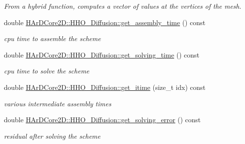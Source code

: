 \begin{DoxyCompactItemize}
\begin{DoxyCompactList}\small\item\em From a hybrid function, computes a vector of values at the vertices of the mesh. \end{DoxyCompactList}\item 
\mbox{\label{group__HHO__Diffusion_ga4b67f061d06b1aea5a626792a2bddd1e}} 
double \hyperlink{group__HHO__Diffusion_ga4b67f061d06b1aea5a626792a2bddd1e}{H\+Ar\+D\+Core2\+D\+::\+H\+H\+O\+\_\+\+Diffusion\+::get\+\_\+assembly\+\_\+time} () const
\begin{DoxyCompactList}\small\item\em cpu time to assemble the scheme \end{DoxyCompactList}\item 
\mbox{\label{group__HHO__Diffusion_ga0ba01c42bc116f962b6982b27e95b471}} 
double \hyperlink{group__HHO__Diffusion_ga0ba01c42bc116f962b6982b27e95b471}{H\+Ar\+D\+Core2\+D\+::\+H\+H\+O\+\_\+\+Diffusion\+::get\+\_\+solving\+\_\+time} () const
\begin{DoxyCompactList}\small\item\em cpu time to solve the scheme \end{DoxyCompactList}\item 
\mbox{\label{group__HHO__Diffusion_ga43051dfce03a9f75c33903f1736f4e1a}} 
double \hyperlink{group__HHO__Diffusion_ga43051dfce03a9f75c33903f1736f4e1a}{H\+Ar\+D\+Core2\+D\+::\+H\+H\+O\+\_\+\+Diffusion\+::get\+\_\+itime} (size\+\_\+t idx) const
\begin{DoxyCompactList}\small\item\em various intermediate assembly times \end{DoxyCompactList}\item 
\mbox{\label{group__HHO__Diffusion_gad53ffa4a52af7bf6803e28f36c7e3365}} 
double \hyperlink{group__HHO__Diffusion_gad53ffa4a52af7bf6803e28f36c7e3365}{H\+Ar\+D\+Core2\+D\+::\+H\+H\+O\+\_\+\+Diffusion\+::get\+\_\+solving\+\_\+error} () const
\begin{DoxyCompactList}\small\item\em residual after solving the scheme \end{DoxyCompactList}\end{DoxyCompactItemize}


